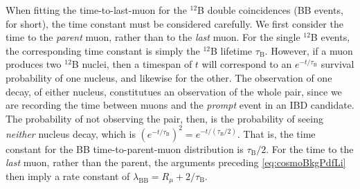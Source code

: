 \documentclass[../thesis.tex]{subfiles}
\begin{document}
When fitting the time-to-last-muon for the $^{12}$B double coincidences (BB events, for short), the time constant must be considered carefully. We first consider the time to the \emph{parent} muon, rather than to the \emph{last} muon. For the single $^{12}$B events, the corresponding time constant is simply the $^{12}$B lifetime $\tau_{\mathrm{B}}$.  However, if a muon produces two $^{12}$B nuclei, then a timespan of $t$ will correspond to an $e^{-t/\tau_{\mathrm{B}}}$ survival probability of one nucleus, and likewise for the other. The observation of one decay, of either nucleus, constitutues an observation of the whole pair, since we are recording the time between muons and the \emph{prompt} event in an IBD candidate. The probability of not observing the pair, then, is the probability of seeing \emph{neither} nucleus decay, which is $(e^{-t/\tau_{\mathrm{B}}})^2 = e^{-t/(\tau_{\mathrm{B}}/2)}$. That is, the time constant for the BB time-to-parent-muon distribution is $\tau_{\mathrm{B}}/2$. For the time to the \emph{last} muon, rather than the parent, the arguments preceding \autoref{eq:cosmoBkgPdfLi} then imply a rate constant of $\lambda_{\mathrm{BB}} = R_\mu + 2/\tau_{\mathrm{B}}$.
\begin{comment}
\footnote{We neglect the possibility of only seeing \emph{one} of the nuclei decay, since the IBD coincidence cut of \us{200} is far shorter than the $^{12}$B lifetime of 29~ms, and therefore, the observation of one decay effectively \emph{implies} the observation of the other.}

 As such, the time constant for BB events is $\tau_{\mathrm{B}}/2$. (I'm not sure I buy this. We are \emph{assuming} that the two decays occur within 200~us of each other, and the probability of seeing them both is basically equivalent to the probability of seeing the first, and the time-to-last-muon PDF for the first just has the time constant of $\tau$. Where the time constant \emph{does} get halved is if we consider a muon that produces two nuclei and we want the probability of seeing none i.e. the time to the next decay.)
\end{comment}

\begin{comment}
  YYY our code has the 12B half-life (20 ms) listed as the lifetime (should be 29 ms). This further exacerbates the use of the mistaken(???) factor of 2??? In total our time constant has been off by a factor of 3 (well, plus the Rmu part)
\end{comment}
\end{document}
